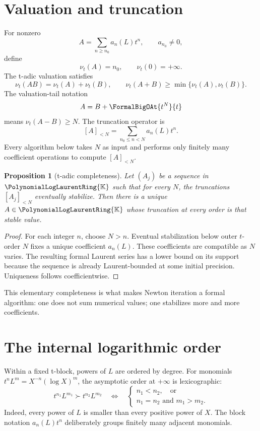 \documentclass[11pt,openany]{book}
\theoremstyle{definition}
\theoremstyle{plain}
\newtheorem{proposition}{Proposition}[chapter]
\theoremstyle{remark}
\newcommand{\K}{\mathbb{K}}
\newcommand{\val}{\nu}
\begin{document}
\section{Valuation and truncation}
For nonzero
\[
 A=\sum_{n\ge n_0}a_n(L)t^n,
 \qquad a_{n_0}\ne0,
\]
define
\begin{equation}\label{eq:qvaluation}
 \val_t(A)=n_0,
 \qquad \val_t(0)=+\infty.
\end{equation}
The t-adic valuation satisfies
\[
 \val_t(AB)=\val_t(A)+\val_t(B),
 \qquad
 \val_t(A+B)\ge\min\{\val_t(A),\val_t(B)\}.
\]
The valuation-tail notation
\[
 A=B+\FormalBigOAt{t^N}{t}
\]
means \(\val_t(A-B)\ge N\).  The truncation operator is
\begin{equation}\label{eq:truncation}
 [A]_{<N}=\sum_{n_0\le n<N}a_n(L)t^n.
\end{equation}
Every algorithm below takes \(N\) as input and performs only finitely many
coefficient operations to compute \([A]_{<N}\).

\begin{proposition}[t-adic completeness]\label{prop:qcomplete}
Let \((A_j)\) be a sequence in \(\PolynomialLogLaurentRing{\K}\) such that for every \(N\), the
truncations \([A_j]_{<N}\) eventually stabilize.  Then there is a unique
\(A\in\PolynomialLogLaurentRing{\K}\) whose truncation at every order is that stable value.
\end{proposition}
\begin{proof}
For each integer \(n\), choose \(N>n\).  Eventual stabilization below outer
\(t\)-order \(N\)
fixes a unique coefficient \(a_n(L)\).  These coefficients are compatible as
\(N\) varies.  The resulting formal Laurent series has a lower bound on its
support because the sequence is already Laurent-bounded at some initial
precision.  Uniqueness follows coefficientwise.
\end{proof}
This elementary completeness is what makes Newton iteration a formal algorithm:
one does not sum numerical values; one stabilizes more and more coefficients.

\section{The internal logarithmic order}
Within a fixed t-block, powers of \(L\) are ordered by degree.  For monomials
\(t^nL^m=X^{-n}(\log X)^m\), the asymptotic order at \(+\infty\) is
lexicographic:
\begin{equation}\label{eq:lex-order}
 t^{n_1}L^{m_1}\succ t^{n_2}L^{m_2}
 \quad\Longleftrightarrow\quad
 \begin{cases}
 n_1<n_2,\quad\text{or}\\
 n_1=n_2\text{ and }m_1>m_2.
 \end{cases}
\end{equation}
Indeed, every power of \(L\) is smaller than every positive power of \(X\).
The block notation \(a_n(L)t^n\) deliberately groups finitely many adjacent
monomials.
\end{document}
